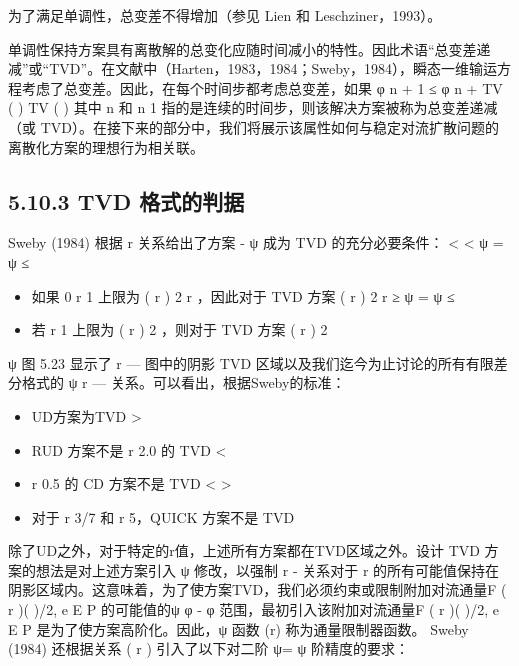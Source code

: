 \documentclass[11pt,a4paper,openany,fontset=none]{ctexbook}
\begin{document}
为了满足单调性，总变差不得增加（参见 Lien 和 Leschziner，1993）。

单调性保持方案具有离散解的总变化应随时间减小的特性。因此术语“总变差递减”或“TVD”。在文献中（Harten，1983，1984；Sweby，1984），瞬态一维输运方程考虑了总变差。因此，在每个时间步都考虑总变差，如果 φ n + 1 ≤ φ n + TV ( ) TV ( ) 其中 n 和 n 1 指的是连续的时间步，则该解决方案被称为总变差递减（或 TVD）。在接下来的部分中，我们将展示该属性如何与稳定对流扩散问题的离散化方案的理想行为相关联。

\subsection*{5.10.3 TVD 格式的判据}

Sweby (1984) 根据 r 关系给出了方案 - ψ 成为 TVD 的充分必要条件： < < ψ = ψ ≤

\begin{itemize}

\item 如果 0 r 1 上限为 ( r ) 2 r ，因此对于 TVD 方案 ( r ) 2 r ≥ ψ = ψ ≤

\item 若 r 1 上限为 ( r ) 2 ，则对于 TVD 方案 ( r ) 2

\end{itemize}

ψ 图 5.23 显示了 r — 图中的阴影 TVD 区域以及我们迄今为止讨论的所有有限差分格式的 ψ r — 关系。可以看出，根据Sweby的标准：

\begin{itemize}

\item UD方案为TVD >

\item RUD 方案不是 r 2.0 的 TVD <

\item r 0.5 的 CD 方案不是 TVD < >

\item 对于 r 3/7 和 r 5，QUICK 方案不是 TVD

\end{itemize}

除了UD之外，对于特定的r值，上述所有方案都在TVD区域之外。设计 TVD 方案的想法是对上述方案引入 ψ 修改，以强制 r - 关系对于 r 的所有可能值保持在阴影区域内。这意味着，为了使方案TVD，我们必须约束或限制附加对流通量F ( r )( )/2, e E P 的可能值的ψ φ - φ 范围，最初引入该附加对流通量F ( r )( )/2, e E P 是为了使方案高阶化。因此，ψ 函数 (r) 称为通量限制器函数。 Sweby (1984) 还根据关系 ( r ) 引入了以下对二阶 ψ= ψ 阶精度的要求：
\end{document}
